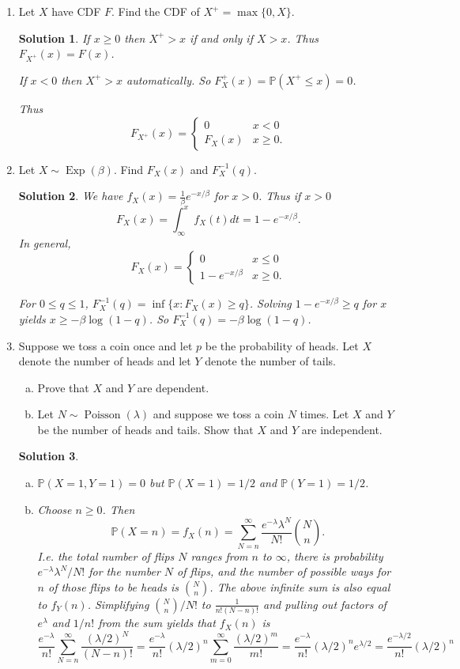 \documentclass[10pt]{article}
\newtheorem*{sol}{Solution}
\renewcommand{\P}{\mathbb{P}}
\newcommand{\Poiss}{\operatorname{Poisson}}
\newcommand{\Exp}{\operatorname{Exp}}
\begin{document}
\begin{enumerate}
\item[(8)] Let $X$ have CDF $F$. Find the CDF of $X^+=\max\{0,X\}$.

\begin{sol}
If $x\geq 0$ then $X^+ > x$ if and only if $X>x$. Thus $F_{X^+}(x)=F(x)$.

If $x<0$ then $X^+>x$ automatically. So $F_X^+(x)=\P(X^+\leq x)=0$.

Thus \[
F_{X^+}(x) =
\begin{cases}
0 & x < 0 \\
F_X(x) & x\geq 0.
\end{cases}
\]
\end{sol}

\item[(9)]
Let $X\sim\Exp(\beta)$. Find $F_X(x)$ and $F_X^{-1}(q)$.

\begin{sol}
We have $f_X(x)=\frac{1}{\beta} e^{-x/\beta}$ for $x > 0$.
Thus if $x>0$
\[
F_X(x) = \int_{\infty}^x f_X(t)dt = 1-e^{-x/\beta}.
\]
In general,
\[
F_X(x) =
\begin{cases}
0 & x \leq 0 \\
1-e^{-x/\beta} & x\geq 0.
\end{cases}
\]

For $0\leq q\leq 1$, $F_X^{-1}(q) = \inf \{x : F_X(x) \geq q\}$. Solving
$1-e^{-x/\beta} \geq q$ for $x$ yields $x\geq -\beta\log(1-q)$. So
$F_X^{-1}(q)=-\beta\log(1-q)$.
\end{sol}

\item[(11)]

Suppose we toss a coin once and let $p$ be the probability of heads. Let
$X$ denote the number of heads and let $Y$ denote the number of tails.
\begin{enumerate}[(a)]
\item Prove that $X$ and $Y$ are dependent.
\item Let $N\sim \Poiss(\lambda)$ and suppose we toss a coin $N$ times.
Let $X$ and
$Y$ be the number of heads and tails. Show that $X$ and $Y$ are independent.
\end{enumerate}

\begin{sol}
\begin{enumerate}[(a)]
\item $\P(X=1, Y=1)=0$ but $\P(X=1)=1/2$ and $\P(Y=1)=1/2$.
\item Choose $n\geq 0$. Then
\[
\P(X=n)=f_X(n) = \sum_{N=n}^\infty \frac{e^{-\lambda}\lambda^N}{N!}\binom{N}{n}.
\]
I.e. the total number of flips $N$ ranges from $n$ to $\infty$, there is
probability $e^{-\lambda}\lambda^N/N!$ for the number $N$ of flips, and
the number of possible ways for $n$ of those flips to be heads is
$\binom{N}{n}$. The above infinite sum is also equal to $f_Y(n)$.
Simplifying $\binom{N}{n}/N!$ to $\frac{1}{n!(N-n)!}$ and pulling out factors
of $e^\lambda$ and $1/n!$ from the sum yields that $f_X(n)$ is
\[
\frac{e^{-\lambda}}{n!} \sum_{N=n}^\infty \frac{(\lambda/2)^N}{(N-n)!}
= \frac{e^{-\lambda}}{n!}(\lambda/2)^n \sum_{m=0}^\infty \frac{(\lambda/2)^m}{m!}
= \frac{e^{-\lambda}}{n!}(\lambda/2)^ne^{\lambda/2}
=\frac{e^{-\lambda/2}}{n!}(\lambda/2)^n
\]


\end{enumerate}
\end{sol}
\end{enumerate}
\end{document}
